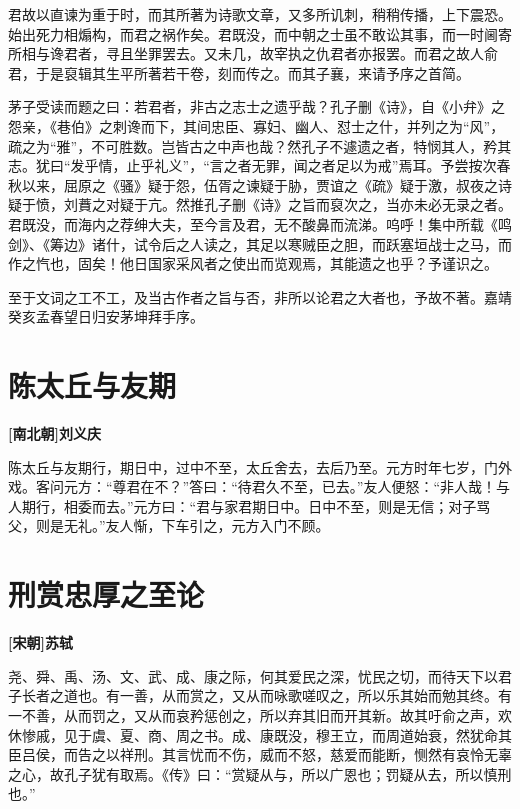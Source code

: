 \documentclass[UTF8,titlepage,oneside]{ctexbook}
\begin{document}
君故以直谏为重于时，而其所著为诗歌文章，又多所讥刺，稍稍传播，上下震恐。始出死力相煽构，而君之祸作矣。君既没，而中朝之士虽不敢讼其事，而一时阃寄所相与谗君者，寻且坐罪罢去。又未几，故宰执之仇君者亦报罢。而君之故人俞君，于是裒辑其生平所著若干卷，刻而传之。而其子襄，来请予序之首简。

茅子受读而题之曰：若君者，非古之志士之遗乎哉？孔子删《诗》，自《小弁》之怨亲，《巷伯》之刺谗而下，其间忠臣、寡妇、幽人、怼士之什，并列之为“风”，疏之为“雅”，不可胜数。岂皆古之中声也哉？然孔子不遽遗之者，特悯其人，矜其志。犹曰“发乎情，止乎礼义”，“言之者无罪，闻之者足以为戒”焉耳。予尝按次春秋以来，屈原之《骚》疑于怨，伍胥之谏疑于胁，贾谊之《疏》疑于激，叔夜之诗疑于愤，刘蕡之对疑于亢。然推孔子删《诗》之旨而裒次之，当亦未必无录之者。君既没，而海内之荐绅大夫，至今言及君，无不酸鼻而流涕。呜呼！集中所载《鸣剑》、《筹边》诸什，试令后之人读之，其足以寒贼臣之胆，而跃塞垣战士之马，而作之忾也，固矣！他日国家采风者之使出而览观焉，其能遗之也乎？予谨识之。

至于文词之工不工，及当古作者之旨与否，非所以论君之大者也，予故不著。嘉靖癸亥孟春望日归安茅坤拜手序。


\chapter*{陈太丘与友期}
\begin{center}
	\textbf{[南北朝]刘义庆}
\end{center}

陈太丘与友期行，期日中，过中不至，太丘舍去，去后乃至。元方时年七岁，门外戏。客问元方：“尊君在不？”答曰：“待君久不至，已去。”友人便怒：“非人哉！与人期行，相委而去。”元方曰：“君与家君期日中。日中不至，则是无信；对子骂父，则是无礼。”友人惭，下车引之，元方入门不顾。


\chapter*{刑赏忠厚之至论}
\begin{center}
	\textbf{[宋朝]苏轼}
\end{center}

尧、舜、禹、汤、文、武、成、康之际，何其爱民之深，忧民之切，而待天下以君子长者之道也。有一善，从而赏之，又从而咏歌嗟叹之，所以乐其始而勉其终。有一不善，从而罚之，又从而哀矜惩创之，所以弃其旧而开其新。故其吁俞之声，欢休惨戚，见于虞、夏、商、周之书。成、康既没，穆王立，而周道始衰，然犹命其臣吕侯，而告之以祥刑。其言忧而不伤，威而不怒，慈爱而能断，恻然有哀怜无辜之心，故孔子犹有取焉。《传》曰：“赏疑从与，所以广恩也；罚疑从去，所以慎刑也。”
\end{document}
